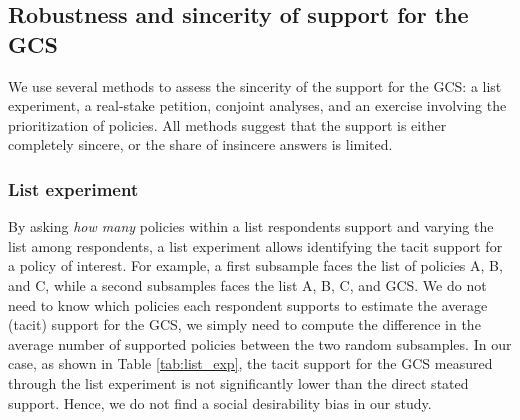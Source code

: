 \subsection{Robustness and sincerity of support for the GCS}\label{subsec:robustness_sincerity}


We use several methods to assess the sincerity of the support for the GCS: a list experiment, a real-stake petition, conjoint analyses, and an exercise involving the prioritization of policies. All methods suggest that the support is either completely sincere, or the share of insincere answers is limited. 

\subsubsection{List experiment}\label{subsubsec:list_exp} %

By asking \textit{how many} policies within a list respondents support and varying the list among respondents, a list experiment allows identifying the tacit support for a policy of interest. 
For example, a first subsample faces the list of policies A, B, and C, while a second subsamples faces the list A, B, C, and GCS. We do not need to know which policies each respondent supports to estimate the average (tacit) support for the GCS, we simply need to compute the difference in the average number of supported policies between the two random subsamples.\citep{imai_multivariate_2011} 
In our case, as shown in Table \ref{tab:list_exp}, the tacit support for the GCS measured through the list experiment is not significantly lower than the direct stated support. %
Hence, we do not find a social desirability bias in our study.

